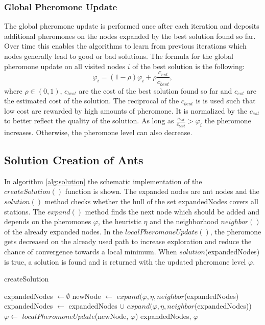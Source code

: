 \subsubsection{Global Pheromone Update}
The global pheromone update is performed once after each iteration and deposits additional pheromones on the nodes expanded by the best solution found so far. Over time this enables the algorithms to learn from previous iterations which nodes generally lead to good or bad solutions. The formula for the global pheromone update on all visited nodes $i$ of the best solution is the following:
$$\varphi_i = (1-\rho) \varphi_i + \rho \frac{c_{est}}{c_{best}},$$
where $\rho \in (0,1)$, $c_{best}$ are the cost of the best solution found so far and $c_{est}$ are the estimated cost of the solution. The reciprocal of the $c_{best}$ is is used such that low cost are rewarded by high amounts of pheromone. It is normalized by the $c_{est}$ to better reflect the quality of the solution. As long as $\frac{c_{est}}{c_{best}} > \varphi_i$ the pheromone increases. Otherwise, the pheromone level can also decrease.

\subsection{Solution Creation of Ants}
In algorithm \ref{alg:solution} the schematic implementation of the $createSolution()$ function is shown. The expanded nodes are ant nodes and the $solution()$ method checks whether the hull of the set expandedNodes covers all stations. The $expand()$ method finds the next node which should be added and depends on the pheromones $\varphi$, the heuristic $\eta$ and the neighborhood $neighbor()$ of the already expanded nodes. In the $localPheromoneUpdate()$, the pheromone gets decreased on the already used path to increase exploration and reduce the chance of convergence towards a local minimum. When $solution$(expandedNodes) is true, a solution is found and is returned with the updated pheromone level $\varphi$. 
\begin{algorithm}[h]
	\caption{createSolution}
	\label{alg:solution}
	\begin{algorithmic}[1]
		\State expandedNodes $\gets \emptyset$
		\State newNode $\gets$ $expand(\varphi, \eta, neighbor$(expandedNodes)
		\State expandedNodes $\gets$ expandedNodes $\cup$ $expand(\varphi, \eta, neighbor$(expandedNodes))
		\State $\varphi \gets$ $localPheromoneUpdate$(newNode, $\varphi$)
		\EndWhile
		\State \Return expandedNodes, $\varphi$
	\end{algorithmic}
\end{algorithm}

